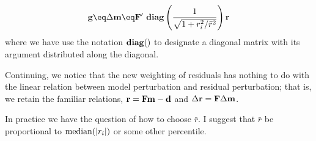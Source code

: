 \begin{equation}
\bold g \eq \Delta\bold m
\eq \bold F' \ {\bf diag} \left(  {1\over\sqrt{1+r_i^2/\bar r^2}}
                  \right) \bold r
\label{eqn:gradwt}
\end{equation}
where we have use the notation ${\bf diag}()$ to designate
a diagonal matrix with its argument distributed along the diagonal.

\par
Continuing, we notice that the new weighting of residuals
has nothing to do with the linear relation between model perturbation
and residual perturbation;
that is,
we retain the familiar relations,
$\bold r = \bold F \bold m -\bold d$ and
$\Delta\bold r = \bold F \Delta\bold m $.

\par
In practice we have the question of how to choose $\bar r$.
I suggest that $\bar r$ be proportional to
${\rm median}(|r_i|)$
or some other percentile.

